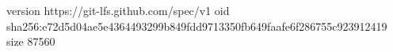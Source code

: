 version https://git-lfs.github.com/spec/v1
oid sha256:e72d5d04ae5e4364493299b849fdd9713350fb649faafe6f286755c923912419
size 87560
